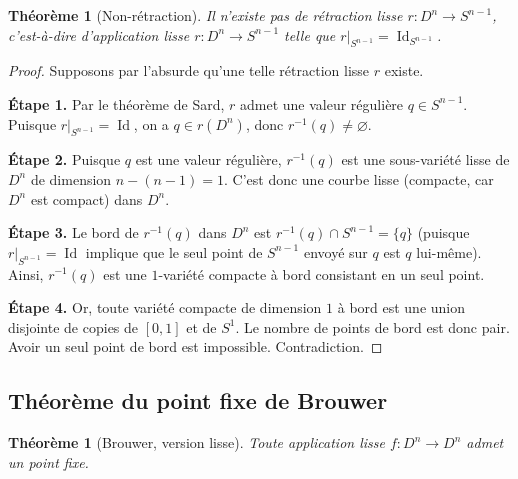 \documentclass[12pt,a4paper,openany]{book}
\theoremstyle{definition}
\theoremstyle{plain}
\newtheorem{theoreme}[definition]{Théorème}
\theoremstyle{remark}
\DeclareMathOperator{\Id}{Id}
\begin{document}
\begin{theoreme}[Non-rétraction]\label{thm:non-retraction}
Il n'existe pas de rétraction lisse $r \colon D^n \to S^{n-1}$, c'est-à-dire
d'application lisse $r \colon D^n \to S^{n-1}$ telle que
$r|_{S^{n-1}} = \Id_{S^{n-1}}$.
\end{theoreme}

\begin{proof}
Supposons par l'absurde qu'une telle rétraction lisse $r$ existe.

\medskip\noindent\textbf{Étape 1.}
Par le théorème de Sard, $r$ admet une valeur régulière
$q \in S^{n-1}$. Puisque $r|_{S^{n-1}} = \Id$, on a $q \in r(D^n)$,
donc $r^{-1}(q) \neq \varnothing$.

\medskip\noindent\textbf{Étape 2.}
Puisque $q$ est une valeur régulière, $r^{-1}(q)$ est une sous-variété lisse
de $D^n$ de dimension $n - (n-1) = 1$. C'est donc une courbe lisse (compacte,
car $D^n$ est compact) dans $D^n$.

\medskip\noindent\textbf{Étape 3.}
Le bord de $r^{-1}(q)$ dans $D^n$ est $r^{-1}(q) \cap S^{n-1} = \{q\}$
(puisque $r|_{S^{n-1}} = \Id$ implique que le seul point de $S^{n-1}$ envoyé
sur $q$ est $q$ lui-même). Ainsi, $r^{-1}(q)$ est une $1$-variété compacte
à bord consistant en un seul point.

\medskip\noindent\textbf{Étape 4.}
Or, toute variété compacte de dimension $1$ à bord est une union disjointe de
copies de $[0,1]$ et de $S^1$. Le nombre de points de bord est donc pair.
Avoir un seul point de bord est impossible. Contradiction.
\end{proof}

\subsection{Théorème du point fixe de Brouwer}\label{ssec:brouwer}

\begin{theoreme}[Brouwer, version lisse]\label{thm:brouwer}
Toute application lisse $f \colon D^n \to D^n$ admet un point fixe.
\end{theoreme}
\end{document}
